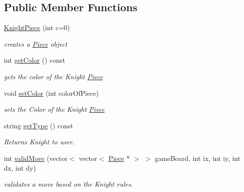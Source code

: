 \subsection*{Public Member Functions}
\begin{DoxyCompactItemize}
\item 
\hypertarget{classKnightPiece_a3575ffe197fb0b40c6c7791d36fd2418}{
\hyperlink{classKnightPiece_a3575ffe197fb0b40c6c7791d36fd2418}{KnightPiece} (int c=0)}
\label{classKnightPiece_a3575ffe197fb0b40c6c7791d36fd2418}

\begin{DoxyCompactList}\small\item\em creates a \hyperlink{classPiece}{Piece} object \item\end{DoxyCompactList}\item 
int \hyperlink{classKnightPiece_ab8ef95a1a625e461ada96e4692599770}{getColor} () const 
\begin{DoxyCompactList}\small\item\em gets the color of the Knight \hyperlink{classPiece}{Piece} \item\end{DoxyCompactList}\item 
void \hyperlink{classKnightPiece_a928091c9100f4e3bc2bb2d10535ccc49}{setColor} (int colorOfPiece)
\begin{DoxyCompactList}\small\item\em sets the Color of the Knight \hyperlink{classPiece}{Piece} \item\end{DoxyCompactList}\item 
string \hyperlink{classKnightPiece_a3b141e4014d09bba70625ccb2129efcc}{getType} () const 
\begin{DoxyCompactList}\small\item\em Returns Knight to user. \item\end{DoxyCompactList}\item 
int \hyperlink{classKnightPiece_a9c8f78a9ef9a5e26c8011cb37a16e702}{validMove} (vector$<$ vector$<$ \hyperlink{classPiece}{Piece} $\ast$ $>$ $>$ gameBoard, int ix, int iy, int dx, int dy)
\begin{DoxyCompactList}\small\item\em validates a move based on the Knight rules. \item\end{DoxyCompactList}\end{DoxyCompactItemize}


